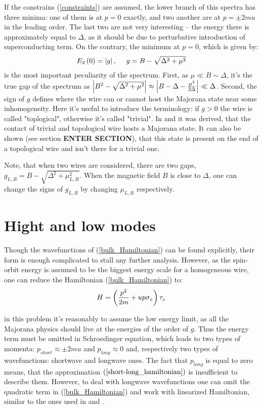 If the constrains (\ref{constraints}) are assumed, the lower branch of this spectra has three minima: one of them is at $ p=0 $ exactly, and two another are at $ p = \pm 2mu $ in the leading order. The last two are not very interesting -- the energy there is approximately equal to $ \Delta $, as it should be due to perturbative introduction of superconducting term. On the contrary, the minimum at $ p=0 $, which is given by\cite{Oreg_2010}:
\begin{gather}
	E_2\left(0\right)=\left|g\right|,~~~~g = B -\sqrt{\Delta^2+\mu^2}
\end{gather}
is the most important peculiarity of the spectrum. First, as $\mu\ll B \sim \Delta $, it's the true gap of the spectrum as $  \left|B^2 -\sqrt{\Delta^2+\mu^2}\right| \approx  \left|B-\Delta -\frac{\mu^2}{2\Delta}\right|\ll\Delta$. Second, the  sign of  $ g $ defines where the wire can or cannot host the Majorana state near some inhomogeneity. Here it's useful to introduce the terminology: if $ g>0 $ the wire is called "toplogical", otherwise it's called "trivial". In \cite{Oreg_2010} and \cite{Lutchyn_2010} it was derived, that the contact of trivial and topological wire hosts a Majorana state. It can also be shown (see section \textbf{ENTER SECTION}), that this state is present on the end of a topological wire and isn't there for a trivial one.

Note, that when two wires are considered, there are two gaps, $ g_{L,R} = B-\sqrt{\Delta^2+\mu_{L,R}^2} $. When the magnetic field $ B $ is close to $ \Delta $, one can change the signs of $ g_{L,R} $ by changing $ \mu_{L,R} $ respectively. 

\section{Hight and low modes}
\label{sec:high_and_low_modes}

Though the wavefunctions of (\ref{bulk_Hamiltonian}) can be found explicitly, their form is enough complicated to stall any further analysis. However, as the spin-orbit energy is assumed to be the biggest energy scale for a homogeneous wire, one can reduce the Hamiltonian (\ref{bulk_Hamiltonian}) to:
\begin{gather}
\label{short-long_hamiltonian}
	H=\left(\frac{p^2}{2m}+up\sigma_z\right)\tau_z
\end{gather}

in this problem it's reasonably to assume the low energy limit, as all the Majorana physics should live at the energies of the order of $ g $. Thus the energy term must be omitted in Schroedinger equation, which leads to two types of momenta: $ p_{short} \approx \pm 2mu$ and $ p_{long}\approx 0$ and, respectively two types of wavefunctions: shortwave and longwave ones. The fact that $ p_{long} $ is equal to zero means, that the approximation $(\ref{short-long_hamiltonian})$ is insufficient to describe them. However, to deal with longwave wavefunctions one can omit the quadratic term in (\ref{bulk_Hamiltonian}) and work with linearized Hamiltonian, similar to the ones used in \cite{Oreg_2010} and \cite{Lutchyn_2010}.